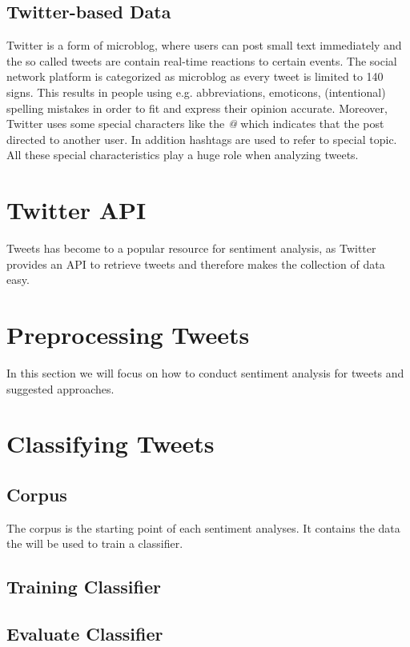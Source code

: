 \documentclass{acm_proc_article-sp}
\begin{document}
\subsection{Twitter-based Data}
Twitter is a form of microblog, where users can post small text immediately and the so called tweets are contain real-time reactions to certain events. The social network platform is categorized as microblog as every tweet is limited to 140 signs. This results in people using e.g. abbreviations, emoticons, (intentional) spelling mistakes in order to fit and express their opinion accurate. Moreover, Twitter uses some special characters like the \emph{@} which indicates that the post directed to another user. In addition hashtags are used to refer to special topic. All these special characteristics play a huge role when analyzing tweets. \cite{agarwal2011sentiment, read2005using}


\section{Twitter API} \label{twitterapi}
Tweets has become to a popular resource for sentiment analysis, as Twitter provides an API to retrieve tweets and therefore makes the collection of data easy.


\section{Preprocessing Tweets} \label{preprocessing}
In this section we will focus on how to conduct sentiment analysis for tweets and suggested approaches.



\section{Classifying Tweets} \label{classification}

\subsection{Corpus}
The corpus is the starting point of each sentiment analyses. It contains the data the will be used to train a classifier.


\subsection{Training Classifier}

\subsection{Evaluate Classifier}
\end{document}
